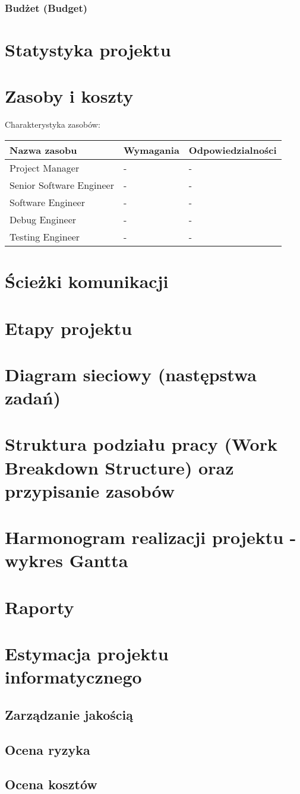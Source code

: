 \subsection{Budżet (Budget)}


\chapter{Statystyka projektu}
\chapter{Zasoby i koszty}
Charakterystyka zasobów:

\begin{center}
    \begin{tabular}{ | l | l | p{5cm} |}
    \hline
    Nazwa zasobu & Wymagania & Odpowiedzialności \\ \hline
    Project Manager & - & - \\ \hline
    Senior Software Engineer & - & - \\ \hline
    Software Engineer & - & - \\ \hline
    Debug Engineer & - & - \\ \hline
    Testing Engineer & - & - \\ \hline
    \hline
    \end{tabular}
\end{center}

\chapter{Ścieżki komunikacji}
\chapter{Etapy projektu}
\chapter{Diagram sieciowy (następstwa zadań)}
\chapter{Struktura podziału pracy (Work Breakdown Structure) oraz przypisanie zasobów}
\chapter{Harmonogram realizacji projektu -  wykres Gantta}
\chapter{Raporty}
\chapter{Estymacja projektu informatycznego}
\section{Zarządzanie jakością}
\section{Ocena ryzyka}
\section{Ocena kosztów}








